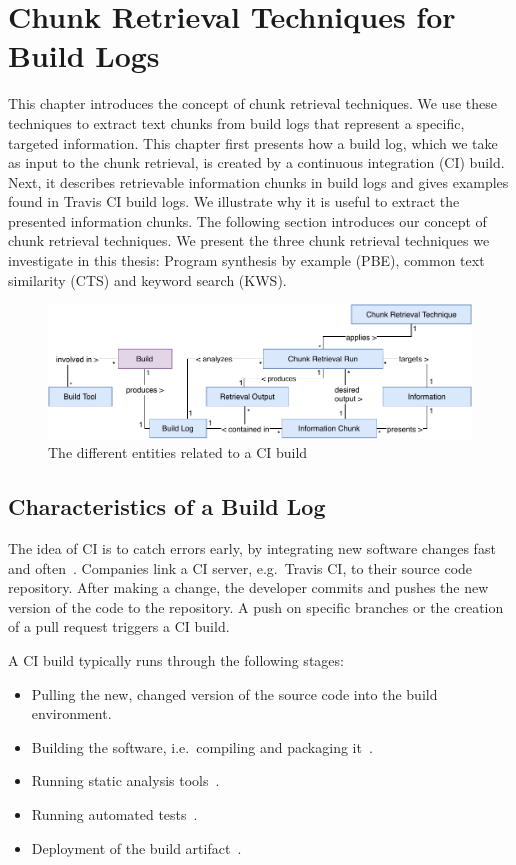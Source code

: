 \documentclass[\myrootdir/main.tex]{subfiles}
\begin{document}
\chapter{Chunk Retrieval Techniques for Build Logs}
\label{sec:techniques}
This chapter introduces the concept of chunk retrieval techniques.
We use these techniques to extract text chunks from build logs that represent a specific, targeted information.
This chapter first presents how a build log, which we take as input to the chunk retrieval, is created by a continuous integration (CI) build.
Next, it describes retrievable information chunks in build logs and gives examples found in Travis CI build logs.
We illustrate why it is useful to extract the presented information chunks.
The following section introduces our concept of chunk retrieval techniques.
We present the three chunk retrieval techniques we investigate in this thesis:
Program synthesis by example (PBE), common text similarity (CTS) and keyword search (KWS).

\begin{figure}[htbp]
	\centering
	\includegraphics[width=\textwidth, clip]{img/build-overview.pdf}
	\caption{The different entities related to a CI build}
	\label{fig:build-overview}
\end{figure}

\section{Characteristics of a Build Log}
\label{sec:bl-characteristics}
The idea of CI is to catch errors early, by integrating new software changes fast and often~\cite{humble2010continuous}.
Companies link a CI server, e.g.\ Travis CI, to their source code repository.
After making a change, the developer commits and pushes the new version of the code to the repository.
A push on specific branches or the creation of a pull request triggers a CI build.

A CI build typically runs through the following stages:
\begin{itemize}
	\item Pulling the new, changed version of the source code into the build environment.
	\item Building the software, i.e.\ compiling and packaging it~\cite{phillips2014understanding}.
	\item Running static analysis tools~\cite{zampetti2017open}.
	\item Running automated tests~\cite{beller2017oops}.
	\item Deployment of the build artifact~\cite{schermann2016empirical}.
\end{itemize}
\end{document}
